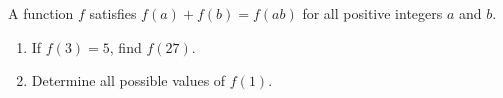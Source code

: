 A function $f$ satisfies $f(a)+f(b)=f(ab)$ for all positive integers $a$ and $b$.
\begin{enumerate}
\item[(a)] If $f(3)=5$, find $f(27)$.
\item[(b)] Determine all possible values of $f(1)$.
\end{enumerate}
